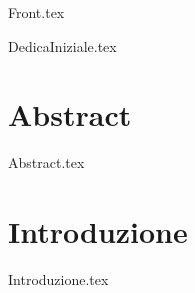 \documentclass[12pt,onesidet]{report}
\begin{document}
	
	\begin{titlepage}
		{Front.tex}
	\end{titlepage}

	{DedicaIniziale.tex}
    
    
    \chapter*{Abstract}
    {Abstract.tex}
    
    \tableofcontents{}
    \listoftables
    \listoflistings
    \newpage
    
    
    \chapter{Introduzione}
    {Introduzione.tex}
    
     
    
    
\end{document}

